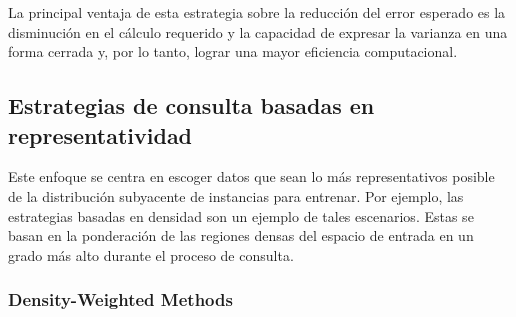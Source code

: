 La principal ventaja de esta estrategia sobre la reducción del error esperado es la disminución en el cálculo
requerido y la capacidad de expresar la varianza en una forma cerrada y, por lo tanto, lograr una mayor eficiencia computacional.



\subsection{Estrategias de consulta basadas en representatividad}

Este enfoque se centra en escoger datos que sean lo más representativos posible de la distribución subyacente de instancias para entrenar. Por ejemplo, las estrategias basadas en densidad son un ejemplo de tales escenarios. Estas se basan en la ponderación de las regiones densas del espacio de entrada en un grado más alto durante el proceso de consulta.

%

\subsubsection{Density-Weighted Methods}

